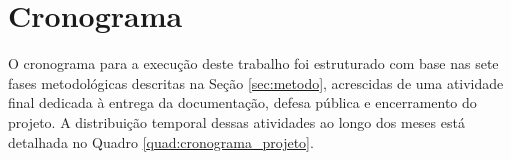 \chapter{Cronograma}\label{cap:cronograma}

O cronograma para a execução deste trabalho foi estruturado com base nas sete fases metodológicas descritas na Seção \ref{sec:metodo}, acrescidas de uma atividade final dedicada à entrega da documentação, defesa pública e encerramento do projeto. A distribuição temporal dessas atividades ao longo dos meses está detalhada no Quadro \ref{quad:cronograma_projeto}. 

\begin{tabframed}[htb]%
 \caption{Cronograma de atividades do projeto}%
 \label{quad:cronograma_projeto}%
 \renewcommand{\arraystretch}{1.5}
 
 

\end{tabframed}
